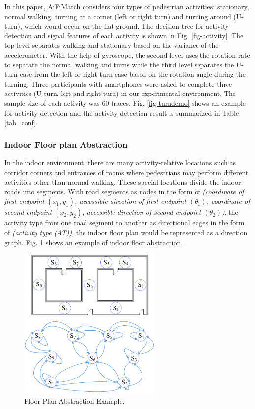 \documentclass[conference]{IEEEtran}
\begin{document}
In this paper, AiFiMatch considers four types of pedestrian activities: stationary, normal walking, turning at a corner (left or right turn) and turning around (U-turn), which would occur on the flat ground. The decision tree for activity detection and signal features of each activity is shown in Fig. \ref{fig-activity}. The top level separates walking and stationary based on the variance of the accelerometer. With the help of gyroscope, the second level uses the rotation rate to separate the normal walking and turns while the third level separates the U-turn case from the left or right turn case based on the rotation angle during the turning. Three participants with smartphones were asked to complete three activities (U-turn, left and right turn) in our experimental environment. The sample size of each activity was $60$ traces. Fig. \ref{fig-turndemo} shows an example for activity detection and the activity detection result is summarized in Table \ref{tab_conf}.

\subsubsection{Indoor Floor plan Abstraction}

In the indoor environment, there are many activity-relative locations such as corridor corners and entrances of rooms where pedestrians may perform different activities other than normal walking. These special locations divide the indoor roads into segments. With road segments as nodes in the form of \emph{(coordinate of first endpoint $(x_1,y_1)$, accessible direction of first endpoint $({\theta}_1)$, coordinate of second endpoint $(x_2,y_2)$, accessible direction of second endpoint $({\theta}_2)$)}, the activity type from one road segment to another as directional edges in the form of \emph{(activity type (AT))}, the indoor floor plan would be represented as a direction graph. Fig. \ref{fig-abstract} shows an example of indoor floor abstraction. 

\begin{figure}[!htbp]
	\centering
	\includegraphics[width=2.776in]{AiFiMatch-MapAbstract}
	\caption{Floor Plan Abstraction Example.}
	\label{fig-abstract}
\end{figure}
\end{document}
